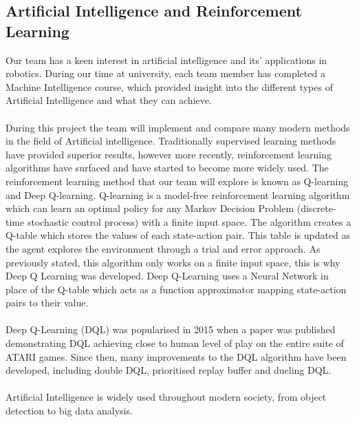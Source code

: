 \documentclass[8pt]{article}
\begin{document}
\subsection{Artificial Intelligence and Reinforcement Learning}
Our team has a keen interest in artificial intelligence and its’ applications in robotics. During our time at university, each team member has completed a Machine Intelligence course, which provided insight into the different types of Artificial Intelligence and what they can achieve.
\\\\
During this project the team will implement and compare many modern methods in the field of Artificial intelligence. Traditionally supervised learning methods have provided superior results, however more recently, reinforcement learning algorithms have surfaced and have started to become more widely used. The reinforcement learning method that our team will explore is known as Q-learning and Deep Q-learning. Q-learning is a model-free reinforcement learning algorithm which can learn an optimal policy for any Markov Decision Problem (discrete-time stochastic control process)\cite{MarkovDecisionProcess} with a finite input space. The algorithm creates a Q-table which stores the values of each state-action pair. This table is updated as the agent explores the environment through a trial and error approach. As previously stated, this algorithm only works on a finite input space, this is why Deep Q Learning was developed. Deep Q-Learning uses a Neural Network in place of the Q-table which acts as a function approximator mapping state-action pairs to their value. 
\\\\
Deep Q-Learning (DQL) was popularised in 2015 when a paper was published \cite{DeepQLearningReleasePaper} demonstrating DQL achieving close to human level of play on the entire suite of ATARI games. Since then, many improvements to the DQL algorithm have been developed, including double DQL,  prioritised replay buffer and dueling DQL.
\\\\
Artificial Intelligence is widely used throughout modern society, from object detection to big data analysis.

\newpage


%
%

%
%
%
\end{document}
